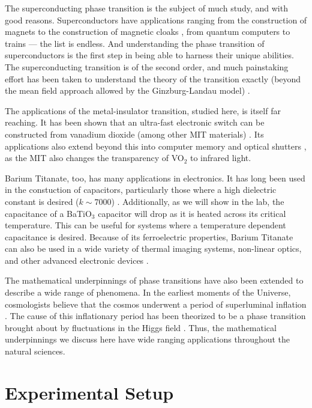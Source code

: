 \documentclass[%
 reprint,
 amsmath,amssymb,
 aps,
 pra,
]{revtex4-1}
\begin{document}
The superconducting phase transition is the subject of much study, and with good reasons. Superconductors have applications ranging from the construction of magnets \cite{magnets} to the construction of magnetic cloaks \cite{rapheal}, from quantum computers \cite{quantum_super, quantum_super2} to trains \cite{trains} --- the list is endless. And understanding the phase transition of superconductors is the first step in being able to harness their unique abilities. The superconducting transition is of the second order, and much painstaking effort has been taken to understand the theory of the transition exactly (beyond the mean field approach allowed by the Ginzburg-Landau model) \cite{superconductor, supercond2, supercond3}.

The applications of the metal-insulator transition, studied here, is itself far reaching. It has been shown that an ultra-fast electronic switch can be constructed from vanadium dioxide (among other MIT materials) \cite{switching}. Its applications also extend beyond this into computer memory and optical shutters \cite{memory}, as the MIT also changes the transparency of VO$_2$ to infrared light.

Barium Titanate, too, has many applications in electronics. It has long been used in the constuction of capacitors, particularly those where a high dielectric constant is desired ($k \sim 7000$) \cite{capacitors}. Additionally, as we will show in the lab, the capacitance of a BaTiO$_3$ capacitor will drop as it is heated across its critical temperature. This can be useful for systems where a temperature dependent capacitance is desired. Because of its ferroelectric properties, Barium Titanate can also be used in a wide variety of thermal imaging systems, non-linear optics, and other advanced electronic devices \cite{thermals}.

The mathematical underpinnings of phase transitions have also been extended to describe a wide range of phenomena. In the earliest moments of the Universe, cosmologists believe that the cosmos underwent a period of superluminal inflation \cite{cosmo}. The cause of this inflationary period has been theorized to be a phase transition brought about by fluctuations in the Higgs field \cite{cosmo2, cosmo3, cosmo4, cosmo5}. Thus, the mathematical underpinnings we discuss here have wide ranging applications throughout the natural sciences.

\section{Experimental Setup}
\end{document}
